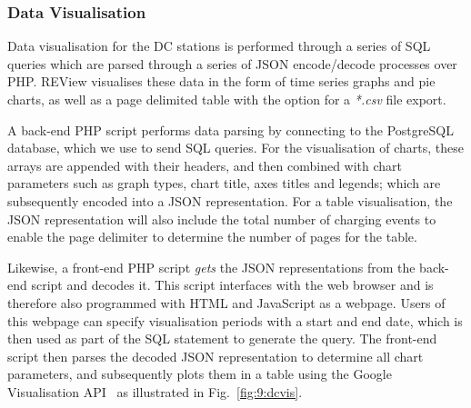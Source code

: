 
\subsubsection{Data Visualisation}
\label{sec:9:dcvis}
Data visualisation for the DC stations is performed through a series of SQL queries which are parsed through a series of JSON encode/decode processes over PHP. REView visualises these data in the form of time series graphs and pie charts, as well as a page delimited table with the option for a \textit{*.csv} file export.


A back-end PHP script performs data parsing by connecting to the PostgreSQL database, which we use to send SQL queries. For the visualisation of charts, these arrays are appended with their headers, and then combined with chart parameters such as graph types, chart title, axes titles and legends; which are subsequently encoded into a JSON representation. For a table visualisation, the JSON representation will also include the total number of charging events to enable the page delimiter to determine the number of pages for the table.

Likewise, a front-end PHP script \textit{gets} the JSON representations from the back-end script and decodes it. This script interfaces with the web browser and is therefore also programmed with HTML and JavaScript as a webpage. Users of this webpage can specify visualisation periods with a start and end date, which is then used as part of the SQL statement to generate the query. The front-end script then parses the decoded JSON representation to determine all chart parameters, and subsequently plots them in a table using the Google Visualisation API~\cite{google_developers_google_nodate} as illustrated in Fig.~\ref{fig:9:dcvis}.

